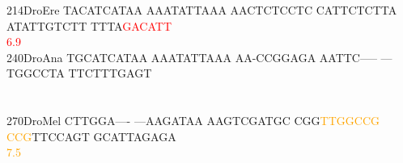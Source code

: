 \documentclass[11pt,twoside,reqno,a4paper]{article}
\begin{document}
{214\hspace*{1\charwidth}DroEre	TACATCATAA	AAATATTAAA	AACTCTCCTC	CATTCTCTTA	ATATTGTCTT	TTTA\textcolor{red}{G}\textcolor{red}{A}\textcolor{red}{C}\textcolor{red}{A}\textcolor{red}{T}\textcolor{red}{T}	\\
\hspace*{4\charwidth}\hspace*{7\charwidth}\hspace*{1\charwidth}\hspace*{1\charwidth}\hspace*{1\charwidth}\hspace*{1\charwidth}\hspace*{1\charwidth}\hspace*{54\charwidth}\textcolor{red}{6.9}\hspace*{1\charwidth}\\
240\hspace*{1\charwidth}DroAna	TGCATCATAA	AAATATTAAA	AA-CCGGAGA	AATTC-----	---TGGCCTA	TTCTTTGAGT	\\
\hspace*{4\charwidth}\hspace*{7\charwidth}\hspace*{1\charwidth}\hspace*{1\charwidth}\hspace*{1\charwidth}\hspace*{1\charwidth}\hspace*{1\charwidth}\hspace*{1\charwidth}\\
\\
270\hspace*{1\charwidth}DroMel	CTTGGA----	---AAGATAA	AAGTCGATGC	CGG\textcolor{orange}{T}\textcolor{orange}{T}\textcolor{orange}{G}\textcolor{orange}{G}\textcolor{orange}{C}\textcolor{orange}{C}\textcolor{orange}{G}	\textcolor{orange}{C}\textcolor{orange}{C}\textcolor{orange}{G}TTCCAGT	GCATTAGAGA	\\
\hspace*{4\charwidth}\hspace*{7\charwidth}\hspace*{1\charwidth}\hspace*{1\charwidth}\hspace*{1\charwidth}\hspace*{33\charwidth}\textcolor{orange}{7.5}\hspace*{1\charwidth}\hspace*{1\charwidth}\hspace*{1\charwidth}\\
}
\end{document}
